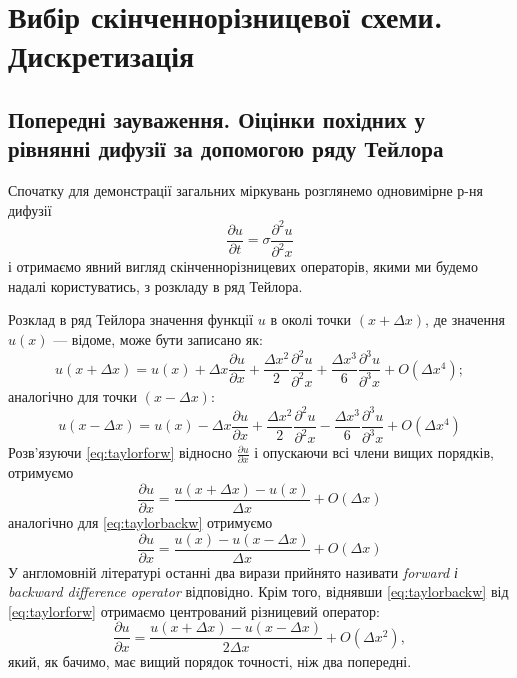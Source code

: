 \section{Вибір скінченнорізницевої схеми. Дискретизація}
\subsection{Попередні зауваження. Оіцінки похідних у рівнянні дифузії за допомогою ряду Тейлора}

Спочатку для демонстрації загальних міркувань розглянемо одновимірне р-ня дифузії
\begin{equation}
\frac{\partial u}{\partial t} = \sigma\frac{\partial^2 u}{\partial^2 x}\label{eq:onedim}
\end{equation}
і отримаємо явний вигляд скінченнорізницевих операторів, якими ми будемо надалі користуватись, з розкладу в ряд Тейлора.

Розклад в ряд Тейлора значення функції $u$ в околі точки $\left(x + \Delta x\right)$, де значення $u(x)$ --- відоме, може бути записано як:
\begin{equation}
u(x+\Delta x) = u(x) +\Delta x\frac{\partial u}{\partial x} + \frac{\Delta x^2}{2}\frac{\partial^2 u}{\partial^2 x} + \frac{\Delta x^3}{6}\frac{\partial^3 u}{\partial^3 x} + O\left(\Delta x^4\right);\label{eq:taylorforw}
\end{equation}
аналогічно для точки $\left(x - \Delta x\right)$: 
\begin{equation}
u(x-\Delta x) = u(x) -\Delta x\frac{\partial u}{\partial x} + \frac{\Delta x^2}{2}\frac{\partial^2 u}{\partial^2 x} - \frac{\Delta x^3}{6}\frac{\partial^3 u}{\partial^3 x} + O\left(\Delta x^4\right)\label{eq:taylorbackw}
\end{equation}
Розв’язуючи \eqref{eq:taylorforw} відносно $\frac{\partial u}{\partial x}$ і опускаючи всі члени вищих порядків, отримуємо
\begin{equation}
\frac{\partial u}{\partial x} = \frac{u(x+\Delta x) - u(x)}{\Delta x} + O\left(\Delta x\right)
\end{equation}
аналогічно для \eqref{eq:taylorbackw} отримуємо
\begin{equation}
\frac{\partial u}{\partial x} = \frac{u(x)-u(x-\Delta x)}{\Delta x} + O\left(\Delta x\right)
\end{equation}
У англомовній літературі останні два вирази прийнято називати \textit{forward і backward difference operator} відповідно. Крім того, віднявши \eqref{eq:taylorbackw} від \eqref{eq:taylorforw} отримаємо центрований різницевий оператор:
\begin{equation}
\frac{\partial u}{\partial x} = \frac{u(x+\Delta x) - u(x-\Delta x)}{2\Delta x} + O\left(\Delta x^2\right),
\end{equation}
який, як бачимо, має вищий порядок точності, ніж два попередні.

